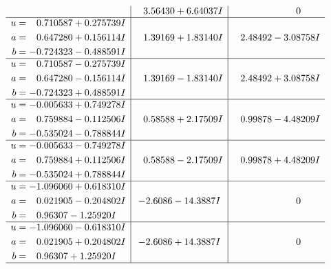 \documentclass[1p]{elsarticle_modified}
\theoremstyle{definition}
\begin{document}
$$\begin{array}{c|c|c}
 & \phantom{-}3.56430 + 6.64037 I & \phantom{-0.000000 } 0 \\ \hline\begin{aligned}
u &= \phantom{-}0.710587 + 0.275739 I \\
a &= \phantom{-}0.647280 + 0.156114 I \\
b &= -0.724323 - 0.488591 I\end{aligned}
 & \phantom{-}1.39169 + 1.83140 I & \phantom{-}2.48492 - 3.08758 I \\ \hline\begin{aligned}
u &= \phantom{-}0.710587 - 0.275739 I \\
a &= \phantom{-}0.647280 - 0.156114 I \\
b &= -0.724323 + 0.488591 I\end{aligned}
 & \phantom{-}1.39169 - 1.83140 I & \phantom{-}2.48492 + 3.08758 I \\ \hline\begin{aligned}
u &= -0.005633 + 0.749278 I \\
a &= \phantom{-}0.759884 - 0.112506 I \\
b &= -0.535024 - 0.788844 I\end{aligned}
 & \phantom{-}0.58588 + 2.17509 I & \phantom{-}0.99878 - 4.48209 I \\ \hline\begin{aligned}
u &= -0.005633 - 0.749278 I \\
a &= \phantom{-}0.759884 + 0.112506 I \\
b &= -0.535024 + 0.788844 I\end{aligned}
 & \phantom{-}0.58588 - 2.17509 I & \phantom{-}0.99878 + 4.48209 I \\ \hline\begin{aligned}
u &= -1.096060 + 0.618310 I \\
a &= \phantom{-}0.021905 - 0.204802 I \\
b &= \phantom{-}0.96307 - 1.25920 I\end{aligned}
 & -2.6086 - 14.3887 I & \phantom{-0.000000 } 0 \\ \hline\begin{aligned}
u &= -1.096060 - 0.618310 I \\
a &= \phantom{-}0.021905 + 0.204802 I \\
b &= \phantom{-}0.96307 + 1.25920 I\end{aligned}
 & -2.6086 + 14.3887 I & \phantom{-0.000000 } 0\\
 \hline 
 \end{array}$$\newpage$$\begin{array}{c|c|c}  

\end{array}$$
\end{document}
